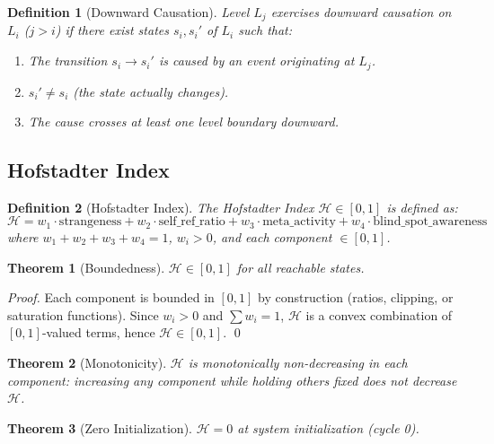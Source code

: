 \documentclass[11pt,a4paper]{article}
\newtheorem{definition}{Definition}[section]
\newtheorem{theorem}{Theorem}[section]
\newcommand{\HI}{\mathcal{H}}  %
\begin{document}
\begin{definition}[Downward Causation]
\label{def:downward}
Level $L_j$ exercises downward causation on $L_i$ ($j > i$) if
there exist states $s_i, s_i'$ of $L_i$ such that:
\begin{enumerate}
  \item[\textbf{DC1}] The transition $s_i \to s_i'$ is caused by
        an event originating at $L_j$.
  \item[\textbf{DC2}] $s_i' \neq s_i$ (the state actually changes).
  \item[\textbf{DC3}] The cause crosses at least one level boundary
        downward.
\end{enumerate}
\end{definition}

\subsection{Hofstadter Index}

\begin{definition}[Hofstadter Index]
\label{def:hi}
The Hofstadter Index $\HI \in [0, 1]$ is defined as:
\begin{equation}
\HI = w_1 \cdot \text{strangeness}
    + w_2 \cdot \text{self\_ref\_ratio}
    + w_3 \cdot \text{meta\_activity}
    + w_4 \cdot \text{blind\_spot\_awareness}
\end{equation}
where $w_1 + w_2 + w_3 + w_4 = 1$, $w_i > 0$, and each component
$\in [0, 1]$.
\end{definition}

\begin{theorem}[Boundedness]
\label{thm:bounded}
$\HI \in [0, 1]$ for all reachable states.
\end{theorem}
\begin{proof}
Each component is bounded in $[0, 1]$ by construction (ratios,
clipping, or saturation functions). Since $w_i > 0$ and
$\sum w_i = 1$, $\HI$ is a convex combination of $[0,1]$-valued
terms, hence $\HI \in [0, 1]$. \qed
\end{proof}

\begin{theorem}[Monotonicity]
\label{thm:monotone}
$\HI$ is monotonically non-decreasing in each component: increasing
any component while holding others fixed does not decrease $\HI$.
\end{theorem}

\begin{theorem}[Zero Initialization]
\label{thm:zero}
$\HI = 0$ at system initialization (cycle 0).
\end{theorem}
\end{document}
